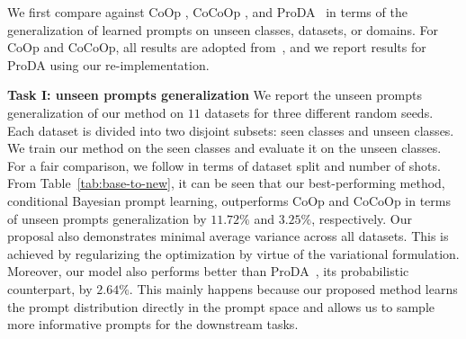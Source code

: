 \documentclass[10pt,twocolumn,letterpaper]{article}
\newcommand{\coop}{CoOp } \newcommand{\coopvpt}{CoOp+VPT } \newcommand{\cocoop}{CoCoOp } \newcommand{\cocoopvpt}{CoCoOp+VPT }
\begin{document}
We first compare against  
\coop \cite{zhou2022learning}, \cocoop \cite{zhou2022conditional}, and ProDA~\cite{lu2022prompt} in terms of the generalization of learned prompts on unseen classes, datasets, or domains. 
For CoOp and CoCoOp, all results are adopted from~\cite{zhou2022conditional}, and we report results for ProDA using our re-implementation. 

\textbf{Task I: unseen prompts generalization} 
We report the unseen prompts generalization of our method on $11$ datasets for three different random seeds. Each dataset is divided into two disjoint subsets: seen classes and unseen classes. We train our method on the seen classes and evaluate it on the unseen classes. For a fair comparison, we follow \cite{zhou2022learning, zhou2022conditional} in terms of dataset split and number of shots. From Table~\ref{tab:base-to-new}, it can be seen that our best-performing method, conditional Bayesian prompt learning, outperforms \coop and \cocoop in terms of unseen prompts generalization by $11.72\%$ and $3.25\%$, respectively. 
Our proposal also demonstrates minimal average variance across all datasets. This is achieved by regularizing the optimization by virtue of the variational formulation. Moreover, our model also performs better than ProDA~\cite{lu2022prompt}, its probabilistic counterpart, by $2.64\%$. This mainly happens because our proposed method learns the prompt distribution directly in the prompt space and allows us to sample more informative prompts for the downstream tasks.
\end{document}
